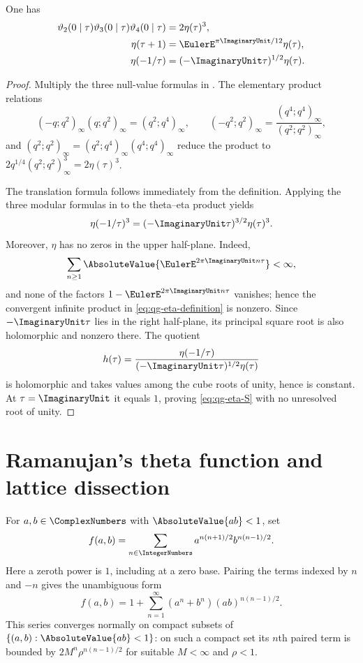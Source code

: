 \begin{theorem}
\label{qg:thm-theta-eta-modular}
One has
\begin{align}
 \vartheta_2(0\mid\tau)\vartheta_3(0\mid\tau)
 \vartheta_4(0\mid\tau)&=2\eta(\tau)^3,
 \label{eq:qg-theta-eta}\\
 \eta(\tau+1)&=\EulerE^{\pi\ImaginaryUnit/12}\eta(\tau),
 \label{eq:qg-eta-T}\\
 \eta(-1/\tau)&=(-\ImaginaryUnit\tau)^{1/2}\eta(\tau).
 \label{eq:qg-eta-S}
\end{align}
\end{theorem}

\begin{proof}
Multiply the three null-value formulas in
.  The elementary product relations
\[
 (-q;q^2)_\infty(q;q^2)_\infty=(q^2;q^4)_\infty,
 \qquad
 (-q^2;q^2)_\infty=\frac{(q^4;q^4)_\infty}{(q^2;q^2)_\infty},
\]
and
$(q^2;q^2)_\infty=(q^2;q^4)_\infty(q^4;q^4)_\infty$
reduce the product to $2q^{1/4}(q^2;q^2)_\infty^3=2\eta(\tau)^3$.

The translation formula follows immediately from the definition.  Applying
the three modular formulas in  to the theta--eta
product yields
\[
 \eta(-1/\tau)^3=(-\ImaginaryUnit\tau)^{3/2}\eta(\tau)^3.
\]
Moreover, $\eta$ has no zeros in the upper half-plane.  Indeed,
\[
 \sum_{n\ge1}\AbsoluteValue{\EulerE^{2\pi\ImaginaryUnit n\tau}}<\infty,
\]
and none of the factors
$1-\EulerE^{2\pi\ImaginaryUnit n\tau}$ vanishes; hence the convergent infinite
product in \eqref{eq:qg-eta-definition} is nonzero.  Since
$-\ImaginaryUnit\tau$ lies in the right half-plane, its principal square root
is also holomorphic and nonzero there.
The quotient
\[
 h(\tau)=\frac{\eta(-1/\tau)}
 {(-\ImaginaryUnit\tau)^{1/2}\eta(\tau)}
\]
is holomorphic and takes values among the cube roots of unity, hence is
constant.  At $\tau=\ImaginaryUnit$ it equals $1$, proving
\eqref{eq:qg-eta-S} with no unresolved root of unity.
\end{proof}

\section{Ramanujan's theta function and lattice dissection}

\begin{definition}
\label{qg:def-ramanujan-theta}
For $a,b\in\ComplexNumbers$ with $\AbsoluteValue{ab}<1$, set
\begin{equation}
 f(a,b)=\sum_{n\in\IntegerNumbers}
 a^{n(n+1)/2}b^{n(n-1)/2}.
\label{eq:qg-ramanujan-theta}
\end{equation}
Here a zeroth power is $1$, including at a zero base.  Pairing the terms
indexed by $n$ and $-n$ gives the unambiguous form
\[
 f(a,b)=1+\sum_{n=1}^{\infty}
 (a^n+b^n)(ab)^{n(n-1)/2}.
\]
This series converges normally on compact subsets of
$\{(a,b):\AbsoluteValue{ab}<1\}$: on such a compact set its $n$th paired
term is bounded by $2M^n\rho^{n(n-1)/2}$ for suitable $M<\infty$ and
$\rho<1$.
\end{definition}

